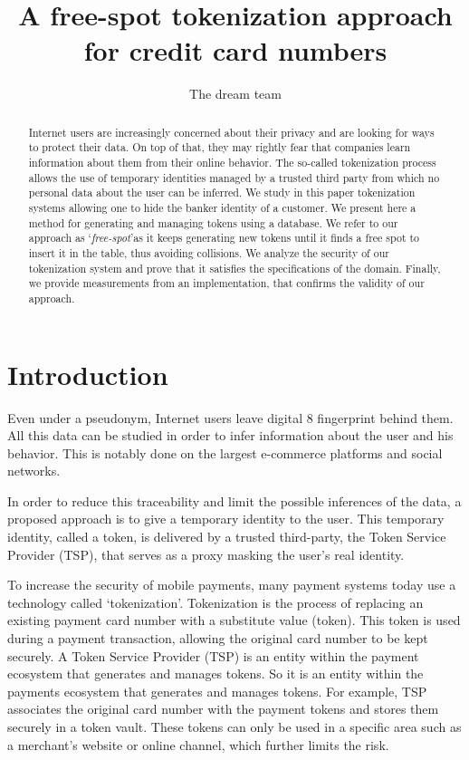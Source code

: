\documentclass{llncs}
\begin{document}
\pagestyle{plain}
\title{A free-spot tokenization approach for credit card numbers}
\author{The dream team}
\maketitle


\begin{abstract}
Internet users are increasingly concerned about their privacy and are looking for ways to protect their data. On top of that, they may rightly fear that companies learn information about them from their online behavior. The so-called tokenization process allows the use of temporary identities managed by a trusted third party from which no personal data about the user can be inferred.
We study in this paper tokenization systems allowing one to hide the banker identity of a customer. We present here a method for generating and managing tokens using a database. We refer to our approach as \lq\textit{free-spot}\rq as it keeps generating new tokens until it finds a free spot to insert it in the table, thus avoiding collisions.
We analyze the security of our tokenization system and prove that it satisfies the specifications of the domain. Finally, we provide measurements from an implementation, that confirms the validity of our approach.
\end{abstract}


\section{Introduction}
Even under a pseudonym, Internet users leave digital 
8
 fingerprint behind them. All this data can be studied in order to infer information about the user and his behavior. This is notably done on the largest e-commerce platforms and social networks.

In order to reduce this traceability and limit the possible inferences of the data, a proposed approach is to give a temporary identity to the user. This temporary identity, called a token, is delivered by a trusted third-party, the Token Service Provider (TSP), that serves as a proxy masking the user's real identity.

To increase the security of mobile payments, many payment systems today use a technology called \lq tokenization\rq. Tokenization is the process of replacing an existing payment card number with a substitute value (token). This token is used during a payment transaction, allowing the original card number to be kept securely. A Token Service Provider (TSP) is an entity within the payment ecosystem that generates and manages tokens. So it is an entity within the payments ecosystem that generates and manages tokens. For example, TSP associates the original card number with the payment tokens and stores them securely in a token vault. These tokens can only be used in a specific area such as a merchant's website or online channel, which further limits the risk. 
\end{document}
